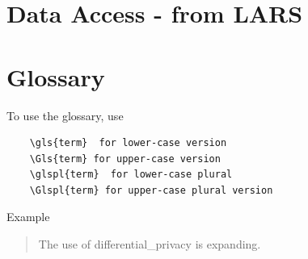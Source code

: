 \documentclass[12pt]{article}
\begin{document}
\section{Data Access - from LARS}


%



\section*{Glossary}
To use the glossary, use 
\begin{verbatim}
    \gls{term}  for lower-case version
    \Gls{term} for upper-case version
    \glspl{term}  for lower-case plural
    \Glspl{term} for upper-case plural version
\end{verbatim}
Example
\begin{quote}
    The use of \gls{differential_privacy} is expanding.
\end{quote}

\glsaddall
\printglossary
\end{document}
